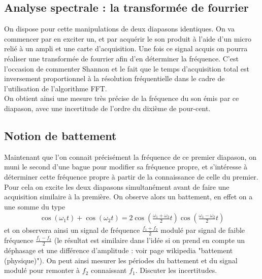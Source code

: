 \documentclass[12pt,prb,aps,epsf]{article}
\begin{document}
\subsection{Analyse spectrale : la transformée de fourrier}	
On dispose pour cette manipulations de deux diapasons identiques. On va commencer par en exciter un, et par acquérir le son produit à l'aide d'un micro relié à un ampli et une carte d'acquisition. Une fois ce signal acquis on pourra réaliser une transformée de fourrier afin d'en déterminer la fréquence. C'est l'occasion de commenter Shannon et le fait que le temps d'acquisition total est inversement proportionnel à la résolution fréquentielle dans le cadre de l'utilisation de l'algorithme FFT.\\ 
On obtient ainsi une mesure très précise de la fréquence du son émis par ce diapason, avec une incertitude de l'ordre du dixième de pour-cent.

\subsection{Notion de battement}
Maintenant que l'on connait précisément la fréquence de ce premier diapason, on muni le second d'une bague pour modifier sa fréquence propre, et s'intéresse à déterminer cette fréquence propre à partir de la connaissance de celle du premier. Pour cela on excite les deux diapasons simultanément avant de faire une acquisition similaire à la première. On observe alors un battement, en effet on a une somme du type 
\begin{eqnarray}
\cos(\omega_1 t) + \cos (\omega_2 t) = 2\cos\left(\frac{\omega_1+\omega_2}{2}t\right) \cos\left(\frac{\omega_1-\omega_2}{2}t\right)
\end{eqnarray}
et on observera ainsi un signal de fréquence $\frac{f_1+f_2}{2}$ modulé par signal de faible fréquence $\frac{f_1 - f_2}{2}$ (le résultat est similaire dans l'idée si on prend en compte un déphasage et une différence d'amplitude : voir page wikipedia "battement (physique)"). On peut ainsi mesurer les périodes du battement et du signal modulé pour remonter à $f_2$ connaissant $f_1$. Discuter les incertitudes.
\end{document}
